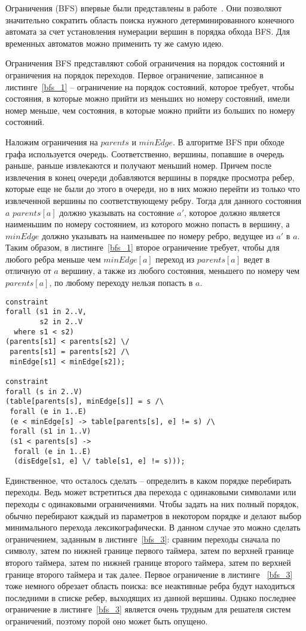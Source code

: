 \documentclass[times,specification,annotation]{itmo-student-thesis}
\begin{document}
Ограничения (BFS) впервые были представлены в работе~\cite{bfs}. Они позволяют значительно сократить область поиска нужного детерминированного конечного 
автомата за счет установления нумерации вершин в порядка обхода BFS. Для временных автоматов можно применить ту же самую идею.

Ограничения BFS представляют собой ограничения на порядок состояний и ограничения на порядок переходов. Первое ограничение, записанное в листинге~\ref{bfs_1} -- ограничение на порядок состояний, которое
требует, чтобы состояния, в которые можно прийти из меньших но номеру состояний, имели номер меньше, чем состояния, в которые можно прийти из больших по номеру состояний. 

Наложим ограничения на $parents$ и $minEdge$. В алгоритме BFS при обходе графа используется очередь. Соответственно, вершины, попавшие в очередь раньше, раньше извлекаются и получают меньший номер.
Причем после извлечения в конец очереди добавляются вершины в порядке просмотра ребер, которые еще не были до этого в очереди, но в них можно перейти из только что извлеченной вершины по
соответствующему ребру. Тогда для данного состояния $a$ $parents[a]$ должно указывать на состояние $a'$, которое должно является наименьшим по номеру состоянием, из которого можно попасть в вершину,
а $minEdge$ должно указывать на наименьшее по номеру ребро, ведущее из $a'$ в $a$.
Таким образом, в листинге~\ref{bfs_1} второе ограничение требует, чтобы для любого ребра меньше чем $minEdge[a]$ переход из $parents[a]$ ведет в отличную от $a$ вершину, а также из любого состояния,
меньшего по номеру чем $parents[a]$, по любому переходу нельзя попасть в $a$.

\begin{lstlisting}[float=!h,language=Mzn,caption={BFS-ограничения},label={bfs_1}]
constraint
forall (s1 in 2..V,
        s2 in 2..V
  where s1 < s2)
(parents[s1] < parents[s2] \/
 parents[s1] = parents[s2] /\
 minEdge[s1] < minEdge[s2]);

constraint
forall (s in 2..V)
(table[parents[s], minEdge[s]] = s /\
 forall (e in 1..E)
 (e < minEdge[s] -> table[parents[s], e] != s) /\
 forall (s1 in 1..V)
 (s1 < parents[s] ->
  forall (e in 1..E)
  (disEdge[s1, e] \/ table[s1, e] != s)));
\end{lstlisting}

Единственное, что осталось сделать -- определить в каком порядке перебирать переходы. Ведь может встретиться два перехода с одинаковыми символами или переходы с одинаковыми ограничениями.
Чтобы задать на них полный порядок, обычно перебирают каждый из параметров в некотором порядке и делают выбор минимального перехода лексикографически. В данном случае это можно сделать
ограничением, заданным в листинге~\ref{bfs_3}: сравним переходы сначала по символу, затем по нижней границе первого таймера, 
затем по верхней границе второго таймера, затем по нижней границе второго таймера, затем
по верхней границе второго таймера и так далее. Первое ограничение в листинге ~\ref{bfs_3} тоже немного обрезает область поиска: все неактивные ребра будут находиться последними в списке ребер,
выходящих из данной вершины. Однако последнее ограничение в листинге~\ref{bfs_3} является очень трудным для решателя систем ограничений, поэтому порой оно может быть опущено.
\end{document}
